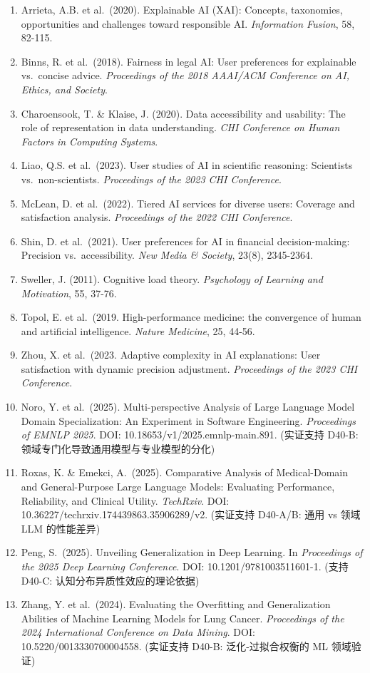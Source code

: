 \documentclass[UTF8, fontset=fandol]{ctexart}
\providecommand{\tightlist}{%
  \setlength{\itemsep}{0pt}\setlength{\parskip}{0pt}}
\begin{document}
\begin{enumerate}
\def\labelenumi{\arabic{enumi}.}
\tightlist
\item
  Arrieta, A.B. et al.~(2020). Explainable AI (XAI): Concepts,
  taxonomies, opportunities and challenges toward responsible AI.
  \emph{Information Fusion}, 58, 82-115.
\item
  Binns, R. et al.~(2018). Fairness in legal AI: User preferences for
  explainable vs.~concise advice. \emph{Proceedings of the 2018 AAAI/ACM
  Conference on AI, Ethics, and Society}.
\item
  Charoensook, T. \& Klaise, J. (2020). Data accessibility and
  usability: The role of representation in data understanding. \emph{CHI
  Conference on Human Factors in Computing Systems}.
\item
  Liao, Q.S. et al.~(2023). User studies of AI in scientific reasoning:
  Scientists vs.~non-scientists. \emph{Proceedings of the 2023 CHI
  Conference}.
\item
  McLean, D. et al.~(2022). Tiered AI services for diverse users:
  Coverage and satisfaction analysis. \emph{Proceedings of the 2022 CHI
  Conference}.
\item
  Shin, D. et al.~(2021). User preferences for AI in financial
  decision-making: Precision vs.~accessibility. \emph{New Media \&
  Society}, 23(8), 2345-2364.
\item
  Sweller, J. (2011). Cognitive load theory. \emph{Psychology of
  Learning and Motivation}, 55, 37-76.
\item
  Topol, E. et al.~(2019. High-performance medicine: the convergence of
  human and artificial intelligence. \emph{Nature Medicine}, 25, 44-56.
\item
  Zhou, X. et al.~(2023. Adaptive complexity in AI explanations: User
  satisfaction with dynamic precision adjustment. \emph{Proceedings of
  the 2023 CHI Conference}.
\item
  Noro, Y. et al.~(2025). Multi-perspective Analysis of Large Language
  Model Domain Specialization: An Experiment in Software Engineering.
  \emph{Proceedings of EMNLP 2025}. DOI: 10.18653/v1/2025.emnlp-main.891.
  (实证支持 D40-B: 领域专门化导致通用模型与专业模型的分化)
\item
  Roxas, K. \& Emekci, A.~(2025). Comparative Analysis of Medical-Domain
  and General-Purpose Large Language Models: Evaluating Performance,
  Reliability, and Clinical Utility. \emph{TechRxiv}.
  DOI: 10.36227/techrxiv.174439863.35906289/v2.
  (实证支持 D40-A/B: 通用 vs 领域 LLM 的性能差异)
\item
  Peng, S.~(2025). Unveiling Generalization in Deep Learning. In
  \emph{Proceedings of the 2025 Deep Learning Conference}.
  DOI: 10.1201/9781003511601-1.
  (支持 D40-C: 认知分布异质性效应的理论依据)
\item
  Zhang, Y. et al.~(2024). Evaluating the Overfitting and Generalization
  Abilities of Machine Learning Models for Lung Cancer.
  \emph{Proceedings of the 2024 International Conference on Data Mining}.
  DOI: 10.5220/0013330700004558.
  (实证支持 D40-B: 泛化-过拟合权衡的 ML 领域验证)
\end{enumerate}
\end{document}
